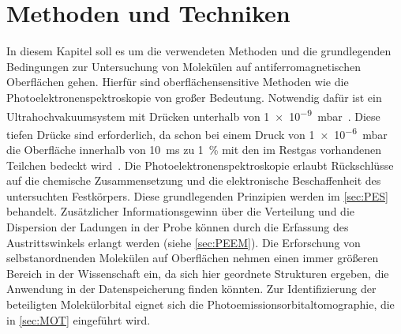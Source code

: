 \chapter{Methoden und Techniken} \label{cha:Methoden}
    In diesem Kapitel soll es um die verwendeten Methoden und die grundlegenden Bedingungen zur Untersuchung von Molekülen auf antiferromagnetischen Oberflächen gehen.
    Hierfür sind oberflächensensitive Methoden wie die Photoelektronenspektroskopie von großer Bedeutung.
    Notwendig dafür ist ein Ultrahochvakuumsystem mit Drücken unterhalb von \SI{1e-9}{\milli\bar}~\cite{Henzler}.
    Diese tiefen Drücke sind erforderlich, da schon bei einem Druck von \SI{1e-6}{\milli\bar} die Oberfläche innerhalb von \SI{10}{\milli\second} zu \SI{1}{\percent} mit den im Restgas vorhandenen Teilchen bedeckt wird~\cite{Henzler}.
    Die Photoelektronenspektroskopie erlaubt Rückschlüsse auf die chemische Zusammensetzung und die elektronische Beschaffenheit des untersuchten Festkörpers.
    Diese grundlegenden Prinzipien werden im \autoref{sec:PES} behandelt.
    Zusätzlicher Informationsgewinn über die Verteilung und die Dispersion der Ladungen in der Probe können durch die Erfassung des Austrittswinkels erlangt werden (siehe \autoref{sec:PEEM}).
    Die Erforschung von selbstanordnenden Molekülen auf Oberflächen nehmen einen immer größeren Bereich in der Wissenschaft ein, da sich hier geordnete Strukturen ergeben, die Anwendung in der Datenspeicherung finden könnten.
    Zur Identifizierung der beteiligten Molekülorbital eignet sich die Photoemissionsorbitaltomographie, die in \autoref{sec:MOT} eingeführt wird.


